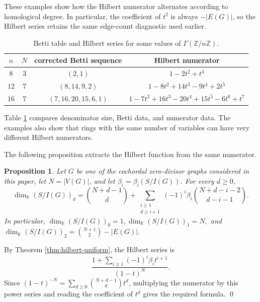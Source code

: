 \documentclass[12pt]{article}
\newtheorem{proposition}[theorem]{Proposition}
\theoremstyle{definition}
\renewenvironment{proof}{{\bf \noindent Proof.}}{\qed}
\begin{document}
\medskip

These examples show how the Hilbert numerator alternates according to homological degree.  In particular, the coefficient of $t^2$ is always $-|E(G)|$, so the Hilbert series retains the same edge-count diagnostic used earlier.

\medskip

\begin{table}[H]
	\begin{center}
\begin{tabular}{cccc}
\toprule
$n$ & $N$ & corrected Betti sequence & Hilbert numerator\\
\midrule
$8$ & $3$ & $(2,1)$ & $1-2t^2+t^3$\\
$12$ & $7$ & $(8,14,9,2)$ & $1-8t^2+14t^3-9t^4+2t^5$\\
$16$ & $7$ & $(7,16,20,15,6,1)$ & $1-7t^2+16t^3-20t^4+15t^5-6t^6+t^7$\\
\bottomrule
\end{tabular}
\end{center}
\caption{Betti table and Hilbert series for some values of $\Gamma(\mathbb{Z}/n\mathbb{Z}).$}
\label{tab 6}
\end{table}

\medskip

Table \ref{tab 6} compares denominator size, Betti data, and numerator data.  The examples also show that rings with the same number of variables can have very different Hilbert numerators.



\medskip

\noindent The following proposition extracts the Hilbert function from the same numerator.
\begin{proposition}\label{prop:hilbert-function-coefficients}
Let $G$ be one of the cochordal zero-divisor graphs considered in this paper, let $N=|V(G)|$, and let $\beta_i=\beta_i(S/I(G))$.  For every $d\geq0$,
$$
\dim_{\mathbb{K}}(S/I(G))_d=\binom{N+d-1}{d}+\sum_{\substack{i\geq1\\ d\geq i+1}}(-1)^i\beta_i\binom{N+d-i-2}{d-i-1}.
$$
In particular,
$ \dim_{\mathbb{K}}(S/I(G))_0=1,
\dim_{\mathbb{K}}(S/I(G))_1=N, $
and $
\dim_{\mathbb{K}}(S/I(G))_2=\binom{N+1}{2}-|E(G)|. $
\end{proposition}

\begin{proof}
By Theorem \ref{thm:hilbert-uniform}, the Hilbert series is
$$
\frac{1+\sum_{i\geq1}(-1)^i\beta_i t^{i+1}}{(1-t)^N}.
$$
Since $(1-t)^{-N}=\sum_{d\geq0}\binom{N+d-1}{d}t^d$, multiplying the numerator by this power series and reading the coefficient of $t^d$ gives the required formula.
\end{proof}
\end{document}
